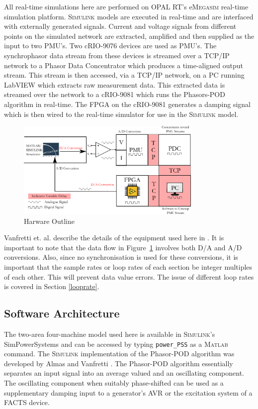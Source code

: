 \documentclass[journal]{IEEEtran}
\begin{document}
All real-time simulations here are performed on OPAL RT's e\textsc{Megasim} \cite{OPALemegasim} real-time simulation platform. \textsc{Simulink} models are executed in real-time and are interfaced with externally generated signals. Current and voltage signals from different points on the simulated network are extracted, amplified and then supplied as the input to two PMU's. Two cRIO-9076 \cite{cRIO9076} devices are used as PMU's. The synchrophasor data stream from these devices is streamed over a TCP/IP network to a Phasor Data Concentrator which produces a time-aligned output stream. This stream is then accessed, via a TCP/IP network, on a PC running LabVIEW which extracts raw measurement data. This extracted data is streamed over the network to a cRIO-9081 which runs the Phasors-POD algorithm in real-time. The FPGA on the cRIO-9081 \cite{cRIO9081} generates a damping signal which is then wired to the real-time simulator for use in the \textsc{Simulink} model.\\

\begin{figure}[!h]
\centering
\includegraphics[width=3.5in]{DataFlow.png} 
\caption{Harware Outline}
\label{Hardware_Outline}
\end{figure}

Vanfretti et. al. describe the details of the equipment used here in \cite{SmarTSLab}. It is important to note that the data flow in Figure~\ref{Hardware_Outline} involves both D/A and A/D conversions. Also, since no synchronisation is used for these conversions, it is important that the sample rates or loop rates of each section be integer multiples of each other. This will prevent data value errors. The issue of different loop rates is covered in Section \ref{looprate}.\\

\subsection{Software Architecture}
The two-area four-machine model used here is available in \textsc{Simulink}'s SimPowerSystems and can be accessed by typing \texttt{power\_PSS} as a \textsc{Matlab} command. The \textsc{Simulink} implementation of the Phasor-POD algorithm was developed by Almas and Vanfretti \cite{PhasorPODImplement}. The Phasor-POD algorithm essentially separates an input signal into an average valued and an oscillating component. The oscillating component when suitably phase-shifted can be used as a supplementary damping input to a generator's AVR or the excitation system of a FACTS device.\\
\end{document}
